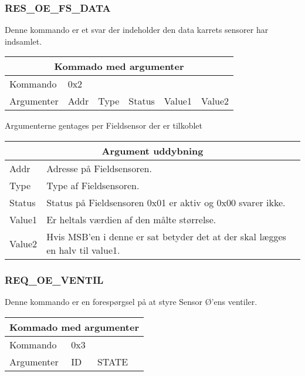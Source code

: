 \subsubsection{RES\_OE\_FS\_DATA}
Denne kommando er et svar der indeholder den data karrets sensorer har indsamlet.

\begin{table}[H]
\setlength{\parindent}{12pt}
\begin{tabular}{|l|lcccc|}
\hline
\multicolumn{6}{|c|}{Kommado med argumenter}\\\hline
Kommando & 0x2 & & & & \\
Argumenter & Addr & Type & Status & Value1 & Value2 \\\hline
\end{tabular}
\end{table}

Argumenterne gentages per Fieldsensor der er tilkoblet

\begin{table}[H]
\setlength{\parindent}{12pt}
\begin{tabular}{|l|l|}
\hline
\multicolumn{2}{|c|}{Argument uddybning}\\\hline
Addr & Adresse på Fieldsensoren. \\
Type & Type af Fieldsensoren. \\
Status & Status på Fieldsensoren 0x01 er aktiv og 0x00 svarer ikke. \\
Value1 & Er heltals værdien af den målte størrelse. \\
Value2 & Hvis MSB'en i denne er sat betyder det at der skal lægges en halv til value1.\\\hline
\end{tabular}
\end{table}

\subsubsection{REQ\_OE\_VENTIL}
Denne kommando er en forespørgsel på at styre Sensor Ø'ens ventiler.

\begin{table}[H]
\setlength{\parindent}{12pt}
\begin{tabular}{|l|lcc|}
\hline
\multicolumn{4}{|c|}{Kommado med argumenter}\\\hline
Kommando & 0x3 & & \\
Argumenter & ID & STATE & \\\hline
\end{tabular}
\end{table}

